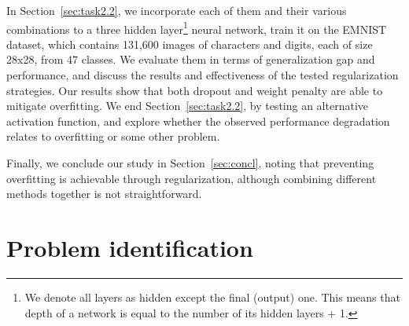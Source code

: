 \documentclass{article}
\begin{document}
In Section~\ref{sec:task2.2}, we incorporate each of them and their various combinations to a three hidden layer\footnote{We denote all layers as hidden except the final (output) one. This means that depth of a network is equal to the number of its hidden layers + 1.} neural network, train it on the EMNIST dataset, which contains 131,600 images of characters and digits, each of size 28x28, from 47 classes.
We evaluate them in terms of generalization gap and performance, and discuss the results and effectiveness of the tested regularization strategies.
Our results show that both dropout and weight penalty are able to mitigate overfitting.
We end Section~\ref{sec:task2.2}, by testing an alternative activation function, and explore whether the observed performance degradation relates to overfitting or some other problem.

Finally, we conclude our study in Section~\ref{sec:concl}, noting that preventing overfitting is achievable through regularization, although combining different methods together is not straightforward.


\section{Problem identification}
\label{sec:task1}
\end{document}
